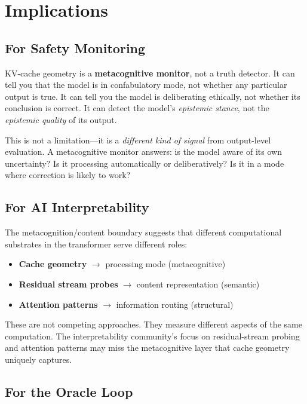 \documentclass[11pt,letterpaper]{article}
\begin{document}
\section{Implications}

\subsection{For Safety Monitoring}

KV-cache geometry is a \textbf{metacognitive monitor}, not a truth
detector. It can tell you that the model is in confabulatory mode, not
whether any particular output is true. It can tell you the model is
deliberating ethically, not whether its conclusion is correct. It can
detect the model's \emph{epistemic stance}, not the \emph{epistemic
quality} of its output.

This is not a limitation---it is a \emph{different kind of signal}
from output-level evaluation. A metacognitive monitor answers: is the
model aware of its own uncertainty? Is it processing automatically or
deliberatively? Is it in a mode where correction is likely to work?

\subsection{For AI Interpretability}

The metacognition/content boundary suggests that different
computational substrates in the transformer serve different roles:

\begin{itemize}[nosep]
\item \textbf{Cache geometry} $\to$ processing mode (metacognitive)
\item \textbf{Residual stream probes} $\to$ content representation
(semantic)
\item \textbf{Attention patterns} $\to$ information routing
(structural)
\end{itemize}

These are not competing approaches. They measure different aspects of
the same computation. The interpretability community's focus on
residual-stream probing and attention patterns may miss the
metacognitive layer that cache geometry uniquely captures.

\subsection{For the Oracle Loop}
\end{document}
